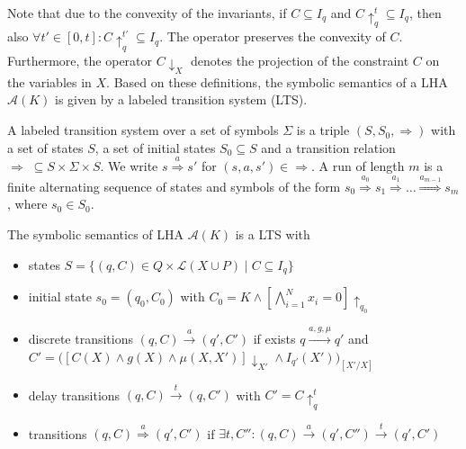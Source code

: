 \documentclass{llncs}
\newcommand{\A}{\ensuremath{\mathcal{A}}}
\newcommand{\trans}[1]{\ensuremath{\overset{#1}{\rightarrow}}}
\newcommand{\Trans}[1]{\ensuremath{\overset{#1}{\Rightarrow}}}
\newcommand{\project}[1]{\ensuremath{\downarrow_{#1}}}
\newcommand{\telapse}{\ensuremath{\uparrow}}
\begin{document}
Note that due to the convexity of the invariants, if $C \subseteq I_q$
and $C\telapse_{q}^{t} \subseteq I_q$, then also $\forall t' \in
[0,t]: C\telapse_{q}^{t'} \subseteq I_q$. The operator preserves the
convexity of $C$.
Furthermore, the operator $C \project{X}$ denotes the projection of the
constraint $C$ on the variables in $X$. Based on these definitions, the
symbolic semantics of a LHA $\A(K)$ is given by a labeled transition
system (LTS).

\begin{definition}\label{def:lts}
  A labeled transition system over a set of symbols $\Sigma$ is a
  triple $(S, S_0, \Rightarrow)$ with a set of states $S$, a set
  of initial states $S_0 \subseteq S$ and a transition relation
  $\Rightarrow \; \subseteq S \times \Sigma \times S$. We write $s
  \Trans{a} s'$ for $(s, a, s') \in \Rightarrow$. A run of length $m$
  is a finite alternating sequence of states and symbols of the form
  $s_0 \Trans{a_0} s_1 \Trans{a_1} \dots \Trans{a_{m-1}} s_m$, where
  $s_0 \in S_0$. 
\end{definition}

\begin{definition}\label{def:ssem}
  The symbolic semantics of LHA $\A(K)$ is a LTS with
  \begin{itemize}
  \item states $S = \{ (q,C) \in Q \times \mathcal{L}(X \cup P) \mid C \subseteq I_q \}$
  \item initial state $s_0 = (q_0, C_0)$ with $C_0 =  K \wedge [\bigwedge_{i=1}^N x_i=0] \telapse_{q_0}$
  \item discrete transitions $(q,C) \trans{a} (q',C')$ if exists $q \trans{a,g,\mu} q'$ and \\
    $C' = \big( \left[ C(X) \wedge g(X) \wedge \mu(X,X') \right]
    \project{X'} \wedge I_{q'}(X') \big)_{[X'/X]}$
  \item delay transitions $(q,C) \trans{t} (q,C')$ with $C' = C \telapse_q^t$
  \item transitions $(q,C) \overset{a}{\Rightarrow} (q',C')$ if $\exists t,C'': (q,C) \trans{a} (q',C'') \trans{t} (q',C')$ %
  \end{itemize}
\end{definition}
\end{document}
